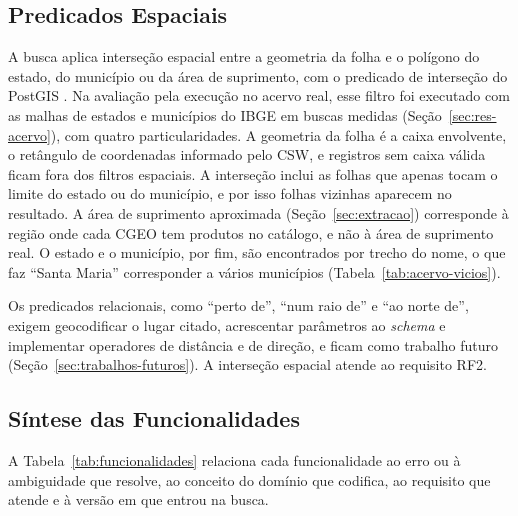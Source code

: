 \subsection{Predicados Espaciais}
\label{sec:predicados}

A busca aplica interseção espacial entre a geometria da folha e o polígono do estado, do município ou da área de suprimento, com o predicado de interseção do PostGIS \cite{postgis2001}. Na avaliação pela execução no acervo real, esse filtro foi executado com as malhas de estados e municípios do IBGE em  buscas medidas (Seção~\ref{sec:res-acervo}), com quatro particularidades. A geometria da folha é a caixa envolvente, o retângulo de coordenadas informado pelo CSW, e  registros sem caixa válida ficam fora dos filtros espaciais. A interseção inclui as folhas que apenas tocam o limite do estado ou do município, e por isso folhas vizinhas aparecem no resultado. A área de suprimento aproximada (Seção~\ref{sec:extracao}) corresponde à região onde cada CGEO tem produtos no catálogo, e não à área de suprimento real. O estado e o município, por fim, são encontrados por trecho do nome, o que faz ``Santa Maria'' corresponder a vários municípios (Tabela~\ref{tab:acervo-vicios}).

Os predicados relacionais, como ``perto de'', ``num raio de'' e ``ao norte de'', exigem geocodificar o lugar citado, acrescentar parâmetros ao \textit{schema} e implementar operadores de distância e de direção, e ficam como trabalho futuro (Seção~\ref{sec:trabalhos-futuros}). A interseção espacial atende ao requisito RF2.

\subsection{Síntese das Funcionalidades}
\label{sec:sintese-funcionalidades}

A Tabela~\ref{tab:funcionalidades} relaciona cada funcionalidade ao erro ou à ambiguidade que resolve, ao conceito do domínio que codifica, ao requisito que atende e à versão em que entrou na busca.

